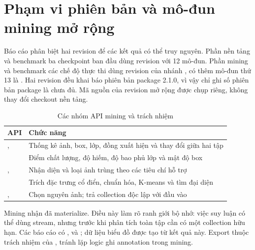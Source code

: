 \section{Phạm vi phiên bản và mô-đun mining mở rộng}
\label{sec:extension-version}
Báo cáo phân biệt hai revision để các kết quả có thể truy nguyên. Phần nền tảng và benchmark ba checkpoint ban đầu dùng revision  với 12 mô-đun. Phần mining và benchmark các chế độ thực thi dùng revision  của nhánh , có thêm mô-đun thứ 13 là . Hai revision đều khai báo phiên bản package 2.1.0, vì vậy chỉ ghi số phiên bản package là chưa đủ. Mã nguồn của revision mở rộng được chụp riêng, không thay đổi checkout nền tảng.

\begin{table}[H]\centering\small
\caption{Các nhóm API mining và trách nhiệm}
\begin{tabularx}{\textwidth}{p{3.6cm}Y}
\toprule API & Chức năng \\\midrule
{},  & Thống kê ảnh, box, lớp, đồng xuất hiện và thay đổi giữa hai tập \\
 & Điểm chất lượng, độ hiếm, độ bao phủ lớp và mật độ box \\
,  & Nhận diện và loại ảnh trùng theo các tiêu chí hỗ trợ \\
 & Trích đặc trưng cổ điển, chuẩn hóa, K-means và tìm đại diện \\
,  & Chọn nguyên ảnh; trả collection độc lập với đầu vào \\
\bottomrule
\end{tabularx}
\end{table}
Mining nhận  đã materialize. Điều này làm rõ ranh giới bộ nhớ: việc suy luận có thể dùng stream, nhưng trước khi phân tích toàn tập cần có một collection hữu hạn. Các báo cáo có ,  và ; dữ liệu biểu đồ được tạo từ kết quả này. Export thuộc trách nhiệm của , tránh lặp logic ghi annotation trong mining.

